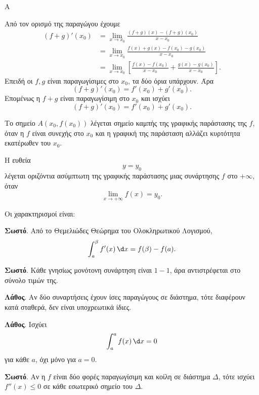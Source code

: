 \begin{thema}{Α}
\begin{erwthma}
\item Από τον ορισμό της παραγώγου έχουμε
\begin{align*}
(f+g)'(x_0)
&=\lim_{x\to x_0}\frac{(f+g)(x)-(f+g)(x_0)}{x-x_0}\\
&=\lim_{x\to x_0}\frac{f(x)+g(x)-f(x_0)-g(x_0)}{x-x_0}\\
&=\lim_{x\to x_0}\left[
\frac{f(x)-f(x_0)}{x-x_0}
+\frac{g(x)-g(x_0)}{x-x_0}
\right].
\end{align*}
Επειδή οι $f,g$ είναι παραγωγίσιμες στο $x_0$, τα δύο όρια υπάρχουν. Άρα
\[
(f+g)'(x_0)=f'(x_0)+g'(x_0).
\]
Επομένως η $f+g$ είναι παραγωγίσιμη στο $x_0$ και ισχύει
\[
{(f+g)'(x_0)=f'(x_0)+g'(x_0)}.
\]

\item Το σημείο $A(x_0,f(x_0))$ λέγεται σημείο καμπής της γραφικής παράστασης της $f$, όταν η $f$ είναι συνεχής στο $x_0$ και η γραφική της παράσταση αλλάζει κυρτότητα εκατέρωθεν του $x_0$.

\item Η ευθεία
\[
y=y_0
\]
λέγεται οριζόντια ασύμπτωτη της γραφικής παράστασης μιας συνάρτησης $f$ στο $+\infty$, όταν
\[
\lim_{x\to+\infty}f(x)=y_0.
\]

\item Οι χαρακτηρισμοί είναι:
\begin{alist}
\item \textbf{Σωστό}. Από το Θεμελιώδες Θεώρημα του Ολοκληρωτικού Λογισμού,
\[
\dint_a^\beta f'(x)\,\d x=f(\beta)-f(a).
\]
\item \textbf{Σωστό}. Κάθε γνησίως μονότονη συνάρτηση είναι $1-1$, άρα αντιστρέφεται στο σύνολο τιμών της.
\item \textbf{Λάθος}. Αν δύο συναρτήσεις έχουν ίσες παραγώγους σε διάστημα, τότε διαφέρουν κατά σταθερά, δεν είναι υποχρεωτικά ίδιες.
\item \textbf{Λάθος}. Ισχύει
\[
\dint_a^a f(x)\,\d x=0
\]
για κάθε $a$, όχι μόνο για $a=0$.
\item \textbf{Σωστό}. Αν η $f$ είναι δύο φορές παραγωγίσιμη και κοίλη σε διάστημα $\varDelta$, τότε ισχύει $f''(x)\leq0$ σε κάθε εσωτερικό σημείο του $\varDelta$.
\end{alist}
\end{erwthma}
\end{thema}

